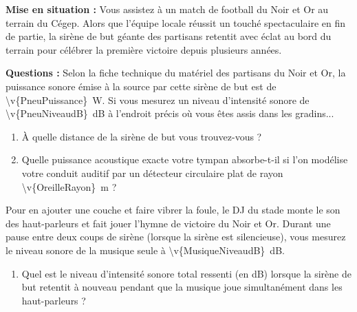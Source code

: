 \textbf{Mise en situation :} Vous assistez à un match de football du Noir et Or au terrain du Cégep. Alors que l'équipe locale réussit un touché spectaculaire en fin de partie, la sirène de but géante des partisans retentit avec éclat au bord du terrain pour célébrer la première victoire depuis plusieurs années.

\textbf{Questions :} Selon la fiche technique du matériel des partisans du Noir et Or, la puissance sonore émise à la source par cette sirène de but est de \qty{\v{PneuPuissance}}{W}. Si vous mesurez un niveau d'intensité sonore de \qty{\v{PneuNiveaudB}}{dB} à l'endroit précis où vous êtes assis dans les gradins...

\begin{enumerate}[label=\alph*)]
    \item À quelle distance de la sirène de but vous trouvez-vous ?
    \item Quelle puissance acoustique exacte votre tympan absorbe-t-il si l'on modélise votre conduit auditif par un détecteur circulaire plat de rayon \qty{\v{OreilleRayon}}{m} ?
\end{enumerate}

Pour en ajouter une couche et faire vibrer la foule, le DJ du stade monte le son des haut-parleurs et fait jouer l'hymne de victoire du Noir et Or. Durant une pause entre deux coups de sirène (lorsque la sirène est silencieuse), vous mesurez le niveau sonore de la musique seule à \qty{\v{MusiqueNiveaudB}}{dB}.

\begin{enumerate}[label= c)]
    \item Quel est le niveau d'intensité sonore total ressenti (en dB) lorsque la sirène de but retentit à nouveau pendant que la musique joue simultanément dans les haut-parleurs ?
\end{enumerate}
